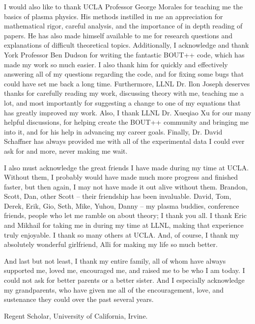 {I would also like to thank UCLA Professor George Morales for teaching me the basics of plasma physics. His methods instilled in me an appreciation for mathematical rigor, careful analysis, and the
importance of in depth reading of papers. He has also made himself available to me for research questions and explanations of difficult theoretical topics. Additionally, I acknowledge and thank
York Professor Ben Dudson for writing the fantastic BOUT++ code, which has made my work so much easier. I also thank him for quickly and effectively answering all of my questions regarding the code,
and for fixing some bugs that could have set me back a long time. Furthermore, LLNL Dr. Ilon Joseph deserves thanks for carefully reading my work, discussing theory with me, teaching me a lot,
and most importantly for suggesting a change to one of my equations that has greatly improved my work. Also, I thank LLNL Dr. Xueqiao Xu for our many helpful discussions, for helping create the
BOUT++ community and bringing me into it, and for his help in advancing my career goals. Finally, Dr. David Schaffner has always provided me with all of the experimental data I could ever ask for and
more, never making me wait.

I also must acknowledge the great friends I have made during my time at UCLA. Without them, I probably would have made much more progress and finished faster, but then again, I may not have made it
out alive without them. Brandon, Scott, Dan, other Scott -- their friendship has been invaluable. David, Tom, Derek, Erik, Gio, Seth, Mike, Yuhou, Danny -- my plasma buddies, conference friends, people
who let me ramble on about theory; I thank you all. I thank Eric and Mikhail for taking me in during my time at LLNL, making that experience truly enjoyable. I thank so many others at UCLA.
And, of course, I thank my absolutely wonderful girlfriend, Alli for making my life so much better.

And last but not least, I thank my entire family, all of whom have always supported me, loved me, encouraged me, and raised me to be who I am today. I could not ask for better parents or a better
sister. And I especially acknowledge my grandparents, who have given me all of the encouragement, love, and sustenance they could over the past several years.}



                {Regent Scholar, University of California, Irvine.}

